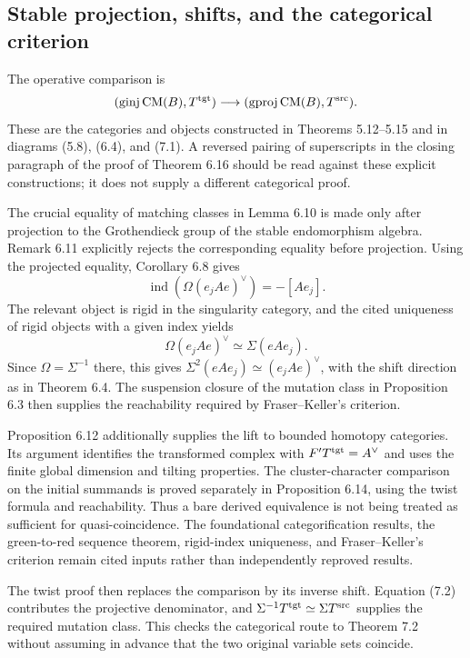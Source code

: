 \documentclass[10pt]{article}
\begin{document}
\subsection*{Stable projection, shifts, and the categorical criterion}
The operative comparison is \[(\operatorname{ginj}\operatorname{CM}(B),T^{\rm tgt})
\longrightarrow
(\operatorname{gproj}\operatorname{CM}(B),T^{\rm src}).\] These are the categories and objects constructed in Theorems 5.12–5.15 and in diagrams (5.8), (6.4), and (7.1). A reversed pairing of superscripts in the closing paragraph of the proof of Theorem 6.16 should be read against these explicit constructions; it does not supply a different categorical proof.\par
The crucial equality of matching classes in Lemma 6.10 is made only after projection to the Grothendieck group of the stable endomorphism algebra. Remark 6.11 explicitly rejects the corresponding equality before projection. Using the projected equality, Corollary 6.8 gives \[\operatorname{ind}\!\left(\Omega(e_jAe)^\vee\right)=-[Ae_j].\] The relevant object is rigid in the singularity category, and the cited uniqueness of rigid objects with a given index yields \[\Omega(e_jAe)^\vee\simeq\Sigma(eAe_j).\] Since \(\Omega=\Sigma^{-1}\) there, this gives \(\Sigma^2(eAe_j)\simeq(e_jAe)^\vee\), with the shift direction as in Theorem 6.4. The suspension closure of the mutation class in Proposition 6.3 then supplies the reachability required by Fraser–Keller’s criterion.\par
Proposition 6.12 additionally supplies the lift to bounded homotopy categories. Its argument identifies the transformed complex with \(F'T^{\rm tgt}=A^\vee\) and uses the finite global dimension and tilting properties. The cluster-character comparison on the initial summands is proved separately in Proposition 6.14, using the twist formula and reachability. Thus a bare derived equivalence is not being treated as sufficient for quasi-coincidence. The foundational categorification results, the green-to-red sequence theorem, rigid-index uniqueness, and Fraser–Keller’s criterion remain cited inputs rather than independently reproved results.\par
The twist proof then replaces the comparison by its inverse shift. Equation (7.2) contributes the projective denominator, and \(\Sigma^{-1}T^{\rm tgt}\simeq\Sigma T^{\rm src}\) supplies the required mutation class. This checks the categorical route to Theorem 7.2 without assuming in advance that the two original variable sets coincide.\par
\end{document}

